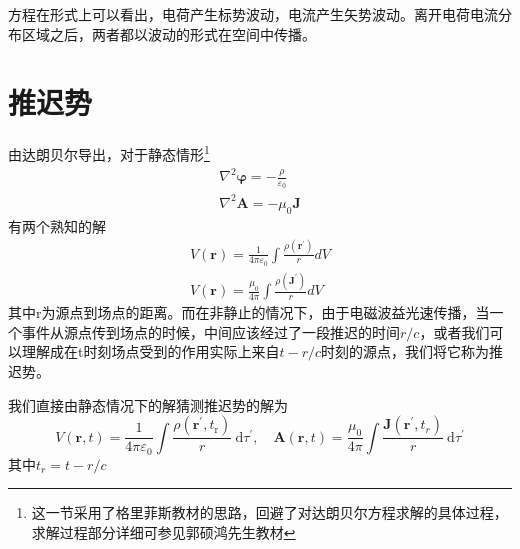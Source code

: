         方程在形式上可以看出，电荷产生标势波动，电流产生矢势波动。离开电荷电流分布区域之后，两者都以波动的形式在空间中传播。
\section{推迟势}
    由达朗贝尔导出，对于静态情形\footnote{这一节采用了格里菲斯教材的思路，回避了对达朗贝尔方程求解的具体过程，求解过程部分详细可参见郭硕鸿先生教材}
    \begin{equation}
        \begin{gathered}
            \nabla^2 \boldsymbol{\varphi} = -\frac{\rho}{\varepsilon_0} \\
            \nabla^2 \boldsymbol{\boldsymbol{A}} = -\mu_0 \boldsymbol{J}
        \end{gathered}
    \end{equation}
    有两个熟知的解
    \begin{equation}
        \begin{gathered}
            V(\boldsymbol{r}) = \frac{1}{4 \pi \varepsilon_0} \int \frac{\rho(\boldsymbol{r}^\prime)}{r}dV \\
            V(\boldsymbol{r}) = \frac{\mu_0}{4 \pi} \int \frac{\rho(\boldsymbol{J}^\prime)}{r}dV
        \end{gathered}
    \end{equation}
    其中r为源点到场点的距离。而在非静止的情况下，由于电磁波益光速传播，当一个事件从源点传到场点的时候，中间应该经过了一段推迟的时间$r/c$，或者我们可以理解成在t时刻场点受到的作用实际上来自$t-r/c$时刻的源点，我们将它称为推迟势。

    我们直接由静态情况下的解猜测推迟势的解为
    \begin{equation}
        \boxed{V(\boldsymbol{r}, t)=\frac{1}{4 \pi \varepsilon_{0}} \int \frac{\rho\left(\boldsymbol{r}^{\prime}, t_{\mathrm{r}}\right)}{r} \mathrm{~d} \tau^{\prime}, \quad \boldsymbol{A}(\boldsymbol{r}, t)=\frac{\mu_{0}}{4 \pi} \int \frac{\boldsymbol{J}\left(\boldsymbol{r}^{\prime}, t_{r}\right)}{r} \mathrm{~d} \tau^{\prime}}
    \end{equation}
    其中$t_r=t-r/c$
    
